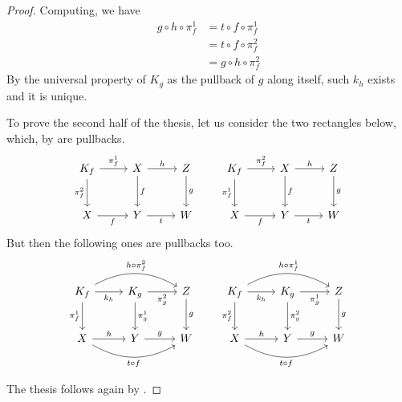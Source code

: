\documentclass[runningheads,envcountsect]{llncs}
\begin{document}
\begin{proof}
    Computing, we have
    \begin{align*}
        g \circ h \circ \pi_f^1 &=  t \circ f \circ \pi_f^1     \\
                                &=  t \circ f \circ \pi_f^2     \\
                                &=  g \circ h \circ \pi_f^2
    \end{align*}
    By the universal property of $K_g$ as the pullback of $g$ along itself, such $k_h$ exists and it is unique.

    To prove the second half of the thesis, let us consider the two rectangles below, which, by  are pullbacks.
    \[\begin{tikzcd}[row sep= 25 pt, column sep= 25 pt]
	{K_f} & X & Z \\
	X & Y & W
	\arrow["{\pi_f^1}", from=1-1, to=1-2]
	\arrow["{\pi_f^2}"', from=1-1, to=2-1]
	\arrow["h", from=1-2, to=1-3]
	\arrow["f", from=1-2, to=2-2]
	\arrow["g", from=1-3, to=2-3]
	\arrow["f"', from=2-1, to=2-2]
	\arrow["t"', from=2-2, to=2-3]
    \end{tikzcd}
    \qquad
    \begin{tikzcd}[row sep = 25 pt, column sep=25 pt]
	{K_f} & X & Z \\
	X & Y & W
	\arrow["{\pi_f^2}", from=1-1, to=1-2]
	\arrow["{\pi_f^1}"', from=1-1, to=2-1]
	\arrow["h", from=1-2, to=1-3]
	\arrow["f", from=1-2, to=2-2]
	\arrow["g", from=1-3, to=2-3]
	\arrow["f"', from=2-1, to=2-2]
	\arrow["t"', from=2-2, to=2-3]
    \end{tikzcd}
    \]
    But then the following ones are pullbacks too.
    \[\begin{tikzcd}[row sep= 25 pt, column sep= 25 pt]
	{K_f} & {K_g} & Z \\
	X & Y & W
	\arrow["{k_h}"', from=1-1, to=1-2]
	\arrow["{\pi_f^1}"', from=1-1, to=2-1]
	\arrow["{\pi_g^2}"', from=1-2, to=1-3]
	\arrow["{\pi_g^1}", from=1-2, to=2-2]
	\arrow["g", from=1-3, to=2-3]
	\arrow["h", from=2-1, to=2-2]
	\arrow["g", from=2-2, to=2-3]
        \arrow["{h\circ \pi_f^2}", from=1-1, to=1-3, bend left = 30]
        \arrow["{t \circ f}"', from=2-1, to=2-3, bend right = 30]
    \end{tikzcd}
    \qquad
    \begin{tikzcd}[row sep = 25 pt, column sep=25 pt]
	{K_f} & {K_g} & Z \\
	X & Y & W
	\arrow["{k_h}"', from=1-1, to=1-2]
	\arrow["{\pi_f^2}"', from=1-1, to=2-1]
	\arrow["{\pi_g^1}"', from=1-2, to=1-3]
	\arrow["{\pi_g^2}", from=1-2, to=2-2]
	\arrow["g", from=1-3, to=2-3]
	\arrow["h", from=2-1, to=2-2]
	\arrow["g", from=2-2, to=2-3]
        \arrow["{h\circ \pi_f^1}", from=1-1, to=1-3, bend left = 30]
        \arrow["{t \circ f}"', from=2-1, to=2-3, bend right = 30]
    \end{tikzcd}
    \]

    The thesis follows again by .
\end{proof}
\end{document}
